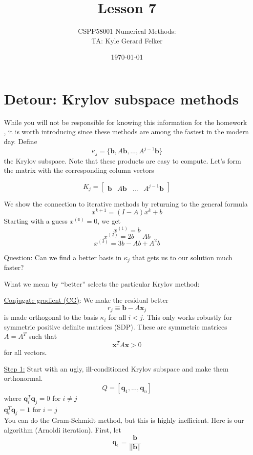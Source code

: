\documentclass[11pt]{article}
\newcommand{\norm}[1]{\left|\left|#1\right|\right|}
\begin{document}
\title{Lesson 7} 
\author{CSPP58001 Numerical Methods: \\ TA: Kyle Gerard Felker}
\date{\today}
\maketitle

\section{Detour: Krylov subspace methods}
While you will not be responsible for knowing this information for the homework , it is worth introducing since these methods are among the fastest in the modern day.
Define
$$ \kappa_j = \{ \mathbf{b}, A\mathbf{b}, \ldots , A^{j-1}\mathbf{b} \} $$
the Krylov subspace. Note that these products are easy to compute. Let's form the matrix with the corresponding column vectors

$$ K_j = \begin{bmatrix} \mathbf{b}  & A\mathbf{b} & \ldots & A^{j-1}\mathbf{b} \end{bmatrix} $$

We show the connection to iterative methods by returning to the general formula
$$x^{k+1} = (I -A)x^k + b $$
Starting with a guess $x^{(0)} = 0$, we get
$$ x^{(1)} = b$$
$$ x^{(2)} = 2b-Ab$$
$$ x^{(3)} = 3b-Ab + A^2b$$

Question: Can we find a better basis in $\kappa_j$ that gets us to our solution much faster?

What we mean by ``better'' selects the particular Krylov method:

\underline{Conjugate gradient (CG)}:
We make the residual better
$$ r_j \equiv \mathbf{b} - A\mathbf{x}_j $$
is made orthogonal to the basis $\kappa_i$ for all $i < j$. This only works robustly for symmetric positive definite matrices (SDP). These are symmetric matrices $A=A^T$ such that
$$\mathbf{x}^T A\mathbf{x} > 0$$
for all vectors.

\underline{Step 1:}
Start with an ugly, ill-conditioned Krylov subspace and make them orthonormal.
$$ Q = [\mathbf{q}_1, \ldots, \mathbf{q}_n ] $$
where 
$\mathbf{q}_i^T\mathbf{q}_j = 0$ for $ i\neq j$ \\
$\mathbf{q}_i^T\mathbf{q}_j = 1$ for $ i= j$ \\
You can do the Gram-Schmidt method, but this is highly inefficient. Here is our algorithm (Arnoldi iteration). First, let
$$\mathbf{q}_1 = \frac{\mathbf{b}}{\norm{\mathbf{b}}} $$
\end{document}
